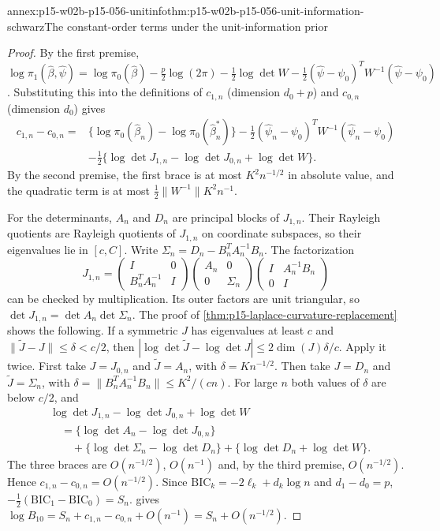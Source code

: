 \begin{annexitem}{annex:p15-w02b-p15-056-unitinfo}{thm:p15-w02b-p15-056-unit-information-schwarz}{The constant-order terms under the unit-information prior}
\begin{proof}
By the first premise,
\(\log\pi_1(\widehat\beta,\widehat\psi)=\log\pi_0(\widehat\beta)
 -\tfrac p2\log(2\pi)-\tfrac12\log\det W
 -\tfrac12(\widehat\psi-\psi_0)^TW^{-1}(\widehat\psi-\psi_0)\).
Substituting this into the definitions of \(c_{1,n}\) (dimension
\(d_0+p\)) and \(c_{0,n}\) (dimension \(d_0\)) gives
\[
\begin{split}
 c_{1,n}-c_{0,n}={}&\{\log\pi_0(\widehat\beta_n)-\log\pi_0(\widehat\beta^*_n)\}
 -\tfrac12(\widehat\psi_n-\psi_0)^TW^{-1}(\widehat\psi_n-\psi_0)\\
 &-\tfrac12\{\log\det J_{1,n}-\log\det J_{0,n}+\log\det W\}.
\end{split}
\]
By the second premise, the first brace is at most \(K^2n^{-1/2}\) in
absolute value, and the quadratic term is at most
\(\tfrac12\|W^{-1}\|K^2n^{-1}\).

For the determinants, \(A_n\) and \(D_n\) are principal blocks of
\(J_{1,n}\). Their Rayleigh quotients are Rayleigh quotients of
\(J_{1,n}\) on coordinate subspaces, so their eigenvalues lie in
\([c,C]\). Write \(\Sigma_n=D_n-B_n^TA_n^{-1}B_n\). The factorization
\[
 J_{1,n}=
 \begin{pmatrix}I&0\\B_n^TA_n^{-1}&I\end{pmatrix}
 \begin{pmatrix}A_n&0\\0&\Sigma_n\end{pmatrix}
 \begin{pmatrix}I&A_n^{-1}B_n\\0&I\end{pmatrix}
\]
can be checked by multiplication. Its outer factors are unit triangular,
so \(\det J_{1,n}=\det A_n\det\Sigma_n\). The proof of
\cref{thm:p15-laplace-curvature-replacement} shows the following. If a
symmetric \(J\) has eigenvalues at least \(c\) and \(\|\widetilde J-J\|\leq\delta<c/2\),
then \(|\log\det\widetilde J-\log\det J|\leq2\dim(J)\delta/c\). Apply it
twice. First take \(J=J_{0,n}\) and \(\widetilde J=A_n\), with
\(\delta=Kn^{-1/2}\). Then take \(J=D_n\) and \(\widetilde J=\Sigma_n\),
with \(\delta=\|B_n^TA_n^{-1}B_n\|\leq K^2/(cn)\). For large \(n\) both
values of \(\delta\) are below \(c/2\), and
\[
\begin{split}
 &\log\det J_{1,n}-\log\det J_{0,n}+\log\det W\\
 &\quad=\{\log\det A_n-\log\det J_{0,n}\}\\
 &\qquad+\{\log\det\Sigma_n-\log\det D_n\}+\{\log\det D_n+\log\det W\}.
\end{split}
\]
The three braces are \(O(n^{-1/2})\), \(O(n^{-1})\) and, by the third
premise, \(O(n^{-1/2})\). Hence \(c_{1,n}-c_{0,n}=O(n^{-1/2})\). Since
\(\mathrm{BIC}_k=-2\ell_k+d_k\log n\) and \(d_1-d_0=p\),
\(-\tfrac12(\mathrm{BIC}_1-\mathrm{BIC}_0)=S_n\).
 gives
\(\log B_{10}=S_n+c_{1,n}-c_{0,n}+O(n^{-1})=S_n+O(n^{-1/2})\).


\end{proof}
\end{annexitem}
